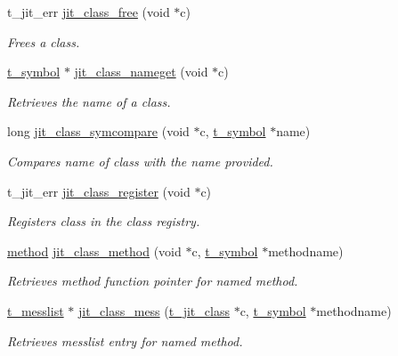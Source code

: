 \begin{DoxyCompactItemize}
t\_\-jit\_\-err \hyperlink{group__classmod_ga2847462538894f23ae00b8265232db09}{jit\_\-class\_\-free} (void $\ast$c)
\begin{DoxyCompactList}\small\item\em Frees a class. \item\end{DoxyCompactList}\item 
\hyperlink{structt__symbol}{t\_\-symbol} $\ast$ \hyperlink{group__classmod_ga5af7e1d4e070475ad79840c0ca3e6f86}{jit\_\-class\_\-nameget} (void $\ast$c)
\begin{DoxyCompactList}\small\item\em Retrieves the name of a class. \item\end{DoxyCompactList}\item 
long \hyperlink{group__classmod_gaeca58f03626ad49dfc7997f979ce602f}{jit\_\-class\_\-symcompare} (void $\ast$c, \hyperlink{structt__symbol}{t\_\-symbol} $\ast$name)
\begin{DoxyCompactList}\small\item\em Compares name of class with the name provided. \item\end{DoxyCompactList}\item 
t\_\-jit\_\-err \hyperlink{group__classmod_ga1cf03eba09d7b3b53a8cde269c47765d}{jit\_\-class\_\-register} (void $\ast$c)
\begin{DoxyCompactList}\small\item\em Registers class in the class registry. \item\end{DoxyCompactList}\item 
\hyperlink{group__datatypes_gac26ba0a173b50597f5738132e059b42d}{method} \hyperlink{group__classmod_ga61fe690506e449d09569e3e8592b274c}{jit\_\-class\_\-method} (void $\ast$c, \hyperlink{structt__symbol}{t\_\-symbol} $\ast$methodname)
\begin{DoxyCompactList}\small\item\em Retrieves method function pointer for named method. \item\end{DoxyCompactList}\item 
\hyperlink{structt__messlist}{t\_\-messlist} $\ast$ \hyperlink{group__classmod_gaa786dc731a24864a74f94e9b19aabdba}{jit\_\-class\_\-mess} (\hyperlink{structt__class}{t\_\-jit\_\-class} $\ast$c, \hyperlink{structt__symbol}{t\_\-symbol} $\ast$methodname)
\begin{DoxyCompactList}\small\item\em Retrieves messlist entry for named method. \item\end{DoxyCompactList}\item 

\end{DoxyCompactItemize}
